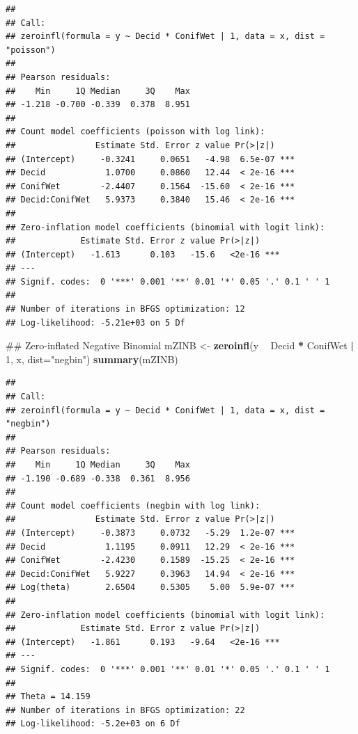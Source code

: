 \documentclass[12pt,]{book}
\newenvironment{Shaded}{\begin{snugshade}}{\end{snugshade}}
\newcommand{\DataTypeTok}[1]{\textcolor[rgb]{0.13,0.29,0.53}{#1}}
\newcommand{\DecValTok}[1]{\textcolor[rgb]{0.00,0.00,0.81}{#1}}
\newcommand{\KeywordTok}[1]{\textcolor[rgb]{0.13,0.29,0.53}{\textbf{#1}}}
\newcommand{\NormalTok}[1]{#1}
\newcommand{\OperatorTok}[1]{\textcolor[rgb]{0.81,0.36,0.00}{\textbf{#1}}}
\newcommand{\StringTok}[1]{\textcolor[rgb]{0.31,0.60,0.02}{#1}}
\begin{document}
\begin{verbatim}
## 
## Call:
## zeroinfl(formula = y ~ Decid * ConifWet | 1, data = x, dist = "poisson")
## 
## Pearson residuals:
##    Min     1Q Median     3Q    Max 
## -1.218 -0.700 -0.339  0.378  8.951 
## 
## Count model coefficients (poisson with log link):
##                Estimate Std. Error z value Pr(>|z|)    
## (Intercept)     -0.3241     0.0651   -4.98  6.5e-07 ***
## Decid            1.0700     0.0860   12.44  < 2e-16 ***
## ConifWet        -2.4407     0.1564  -15.60  < 2e-16 ***
## Decid:ConifWet   5.9373     0.3840   15.46  < 2e-16 ***
## 
## Zero-inflation model coefficients (binomial with logit link):
##             Estimate Std. Error z value Pr(>|z|)    
## (Intercept)   -1.613      0.103   -15.6   <2e-16 ***
## ---
## Signif. codes:  0 '***' 0.001 '**' 0.01 '*' 0.05 '.' 0.1 ' ' 1 
## 
## Number of iterations in BFGS optimization: 12 
## Log-likelihood: -5.21e+03 on 5 Df
\end{verbatim}

\begin{Shaded}
\begin{Highlighting}[]
\NormalTok{## Zero-inflated Negative Binomial}
\NormalTok{mZINB <-}\StringTok{ }\KeywordTok{zeroinfl}\NormalTok{(y }\OperatorTok{~}\StringTok{ }\NormalTok{Decid }\OperatorTok{*}\StringTok{ }\NormalTok{ConifWet }\OperatorTok{|}\StringTok{ }\DecValTok{1}\NormalTok{, x, }\DataTypeTok{dist=}\StringTok{"negbin"}\NormalTok{)}
\KeywordTok{summary}\NormalTok{(mZINB)}
\end{Highlighting}
\end{Shaded}

\begin{verbatim}
## 
## Call:
## zeroinfl(formula = y ~ Decid * ConifWet | 1, data = x, dist = "negbin")
## 
## Pearson residuals:
##    Min     1Q Median     3Q    Max 
## -1.190 -0.689 -0.338  0.361  8.956 
## 
## Count model coefficients (negbin with log link):
##                Estimate Std. Error z value Pr(>|z|)    
## (Intercept)     -0.3873     0.0732   -5.29  1.2e-07 ***
## Decid            1.1195     0.0911   12.29  < 2e-16 ***
## ConifWet        -2.4230     0.1589  -15.25  < 2e-16 ***
## Decid:ConifWet   5.9227     0.3963   14.94  < 2e-16 ***
## Log(theta)       2.6504     0.5305    5.00  5.9e-07 ***
## 
## Zero-inflation model coefficients (binomial with logit link):
##             Estimate Std. Error z value Pr(>|z|)    
## (Intercept)   -1.861      0.193   -9.64   <2e-16 ***
## ---
## Signif. codes:  0 '***' 0.001 '**' 0.01 '*' 0.05 '.' 0.1 ' ' 1 
## 
## Theta = 14.159 
## Number of iterations in BFGS optimization: 22 
## Log-likelihood: -5.2e+03 on 6 Df
\end{verbatim}
\end{document}
